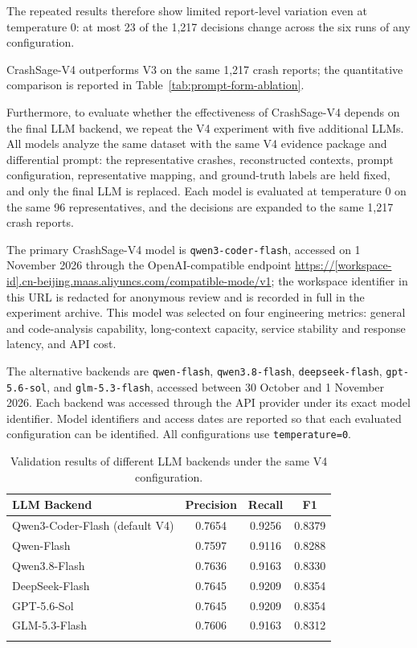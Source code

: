 \documentclass[pdflatex,sn-basic]{sn-jnl}%
\renewcommand{\arraystretch}{1.16}%
\theoremstyle{thmstyleone}%
\theoremstyle{thmstyletwo}%
\theoremstyle{thmstylethree}%
\begin{document}
{\color{blue}
The repeated results therefore show limited report-level variation even at temperature 0: at most 23 of the 1,217 decisions change across the six runs of any configuration.
}


{\color{blue}
CrashSage-V4 outperforms V3 on the same 1,217 crash reports; the quantitative comparison is reported in Table~\ref{tab:prompt-form-ablation}.
}

Furthermore, to evaluate {\color{blue}whether the effectiveness of CrashSage-V4 depends on the final LLM backend}, we {\color{blue}repeat the V4 experiment with five additional LLMs}. All models analyze the same dataset with the same V4 evidence package and differential prompt: {\color{blue}the representative crashes, reconstructed contexts, prompt configuration, representative mapping, and ground-truth labels are held fixed, and only the final LLM is replaced. Each model is evaluated at temperature 0 on the same 96 representatives, and the decisions are expanded to the same 1,217 crash reports.}

{\color{blue}
The primary CrashSage-V4 model is \texttt{qwen3-coder-flash}, accessed on 1 November 2026 through the OpenAI-compatible endpoint \url{https://[workspace-id].cn-beijing.maas.aliyuncs.com/compatible-mode/v1}; the workspace identifier in this URL is redacted for anonymous review and is recorded in full in the experiment archive. This model was selected on four engineering metrics: general and code-analysis capability, long-context capacity, service stability and response latency, and API cost.

The alternative backends are \texttt{qwen-flash}, \texttt{qwen3.8-flash}, \texttt{deepseek-flash}, \texttt{gpt-5.6-sol}, and \texttt{glm-5.3-flash}, accessed between 30 October and 1 November 2026. Each backend was accessed through the API provider under its exact model identifier. Model identifiers and access dates are reported so that each evaluated configuration can be identified. All configurations use \texttt{temperature=0}.
}

\begin{table}[!htbp]
\caption{{\color{blue}Validation results of different LLM backends under the same V4 configuration.}}
\label{tab:llm-model-ablation}
\centering
\color{blue}
\scriptsize
\setlength{\tabcolsep}{3.2pt}
\renewcommand{\arraystretch}{1.12}
\begin{tabular*}{\linewidth}{@{\extracolsep{\fill}}lccc}
\toprule
LLM Backend & Precision & Recall & F1 \\
\midrule
Qwen3-Coder-Flash (default V4) & 0.7654 & 0.9256 & 0.8379 \\
Qwen-Flash & 0.7597 & 0.9116 & 0.8288 \\
Qwen3.8-Flash & 0.7636 & 0.9163 & 0.8330 \\
DeepSeek-Flash & 0.7645 & 0.9209 & 0.8354 \\
GPT-5.6-Sol & 0.7645 & 0.9209 & 0.8354 \\
GLM-5.3-Flash & 0.7606 & 0.9163 & 0.8312 \\
\botrule
\end{tabular*}
\end{table}
\end{document}
